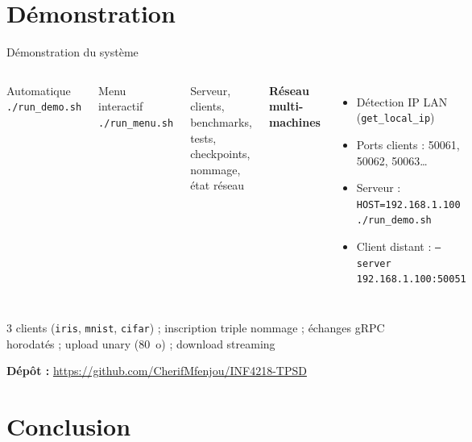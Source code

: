 \documentclass[11pt,french]{beamer}
\begin{document}
\section{Démonstration}

\begin{frame}{Démonstration du système}
  \begin{columns}[T]
    \begin{block}{Automatique}
      \texttt{./run\_demo.sh}
    \end{block}
    \begin{block}{Menu interactif}
      \texttt{./run\_menu.sh}
    \end{block}
    \small
    Serveur, clients, benchmarks, tests, checkpoints, nommage, état réseau

    \textbf{Réseau multi-machines}
    \begin{itemize}\small
      \item Détection IP LAN (\texttt{get\_local\_ip})
      \item Ports clients : 50061, 50062, 50063\ldots
      \item Serveur : \texttt{HOST=192.168.1.100 ./run\_demo.sh}
      \item Client distant : \texttt{--server 192.168.1.100:50051}
    \end{itemize}
  \end{columns}

  \vspace{0.3cm}
  \small
  3 clients (\texttt{iris}, \texttt{mnist}, \texttt{cifar}) ; inscription triple nommage ;
  échanges gRPC horodatés ; upload unary (80~o) ; download streaming

  \vspace{0.2cm}
  \small\textbf{Dépôt :} \url{https://github.com/CherifMfenjou/INF4218-TPSD}
\end{frame}

\section{Conclusion}
\end{document}
